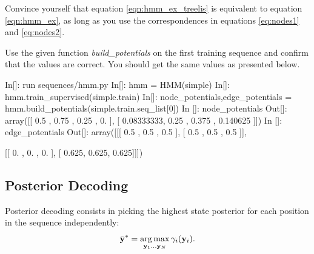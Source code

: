 
\begin{exercise}
Convince yourself that equation \ref{eqn:hmm_ex_treelis} is equivalent to equation \ref{eqn:hmm_ex}, as long as you use the correspondences in equations \eqref{eq:nodes1} and \eqref{eq:nodes2}.

Use the given function \emph{build\_potentials} on the first training sequence and confirm that the values are correct. You should get the same values as presented below.


%

\begin{python}
In[]: run sequences/hmm.py
In[]: hmm = HMM(simple)
In[]: hmm.train_supervised(simple.train)
In[]: node_potentials,edge_potentials = hmm.build_potentials(simple.train.seq_list[0])
In []: node_potentials
Out[]: 
array([[ 0.5       ,  0.75      ,  0.25      ,  0.        ],
       [ 0.08333333,  0.25      ,  0.375     ,  0.140625  ]])
In []: edge_potentials
Out[]: 
array([[[ 0.5  ,  0.5  ,  0.5  ],
        [ 0.5  ,  0.5  ,  0.5  ]],

       [[ 0.   ,  0.   ,  0.   ],
        [ 0.625,  0.625,  0.625]]])
\end{python}
\end{exercise}



\subsection{Posterior Decoding}
Posterior decoding consists
in picking the highest state posterior for each position in the sequence independently:
\begin{equation}
\bar{\mathbf{y}}^* = \operatorname*{arg\,max}_{\mathbf{y}_1 \ldots \mathbf{y}_N} \gamma_i(\mathbf{y}_i).
\end{equation}

